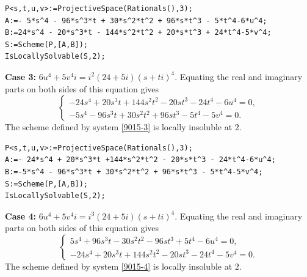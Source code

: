 \documentclass[a4paper,12pt,english,reqno]{amsart}
\begin{document}

\begin{lstlisting}
P<s,t,u,v>:=ProjectiveSpace(Rationals(),3);
A:=- 5*s^4 - 96*s^3*t + 30*s^2*t^2 + 96*s*t^3 - 5*t^4-6*u^4;
B:=24*s^4 - 20*s^3*t - 144*s^2*t^2 + 20*s*t^3 + 24*t^4-5*v^4;
S:=Scheme(P,[A,B]);
IsLocallySolvable(S,2);
\end{lstlisting}

{\bf Case 3:} $6u^4+5v^4i=i^2(24+5i)(s+ti)^4$. Equating the real and imaginary parts on both sides of this equation gives
\begin{equation}\label{9015-3}
\begin{cases}
-24s^4 + 20s^3t + 144s^2t^2 - 20st^3 - 24t^4 - 6u^4=0,\\
-5s^4 - 96s^3t + 30s^2t^2 + 96st^3 - 5t^4 - 5v^4=0.
\end{cases}
\end{equation}
The scheme defined by system \eqref{9015-3} is locally insoluble at $2$.

\begin{lstlisting}
P<s,t,u,v>:=ProjectiveSpace(Rationals(),3);
A:=- 24*s^4 + 20*s^3*t +144*s^2*t^2 - 20*s*t^3 - 24*t^4-6*u^4;
B:=-5*s^4 - 96*s^3*t + 30*s^2*t^2 + 96*s*t^3 - 5*t^4-5*v^4;
S:=Scheme(P,[A,B]);
IsLocallySolvable(S,2);
\end{lstlisting}


{\bf Case 4:} $6u^4+5v^4i=i^3(24+5i)(s+ti)^4$. Equating the real and imaginary parts on both sides of this equation gives
\begin{equation}\label{9015-4}
\begin{cases}
5s^4 + 96s^3t - 30s^2t^2 - 96st^3 + 5t^4 - 6u^4=0,\\
-24s^4 + 20s^3t + 144s^2t^2 - 20st^3 - 24t^4 - 5v^4=0.
\end{cases}
\end{equation}
The scheme defined by system \eqref{9015-4} is locally insoluble at $2$.
\end{document}
